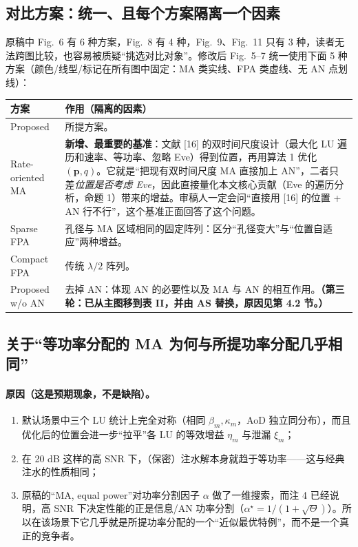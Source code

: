 \documentclass[11pt,a4paper]{ctexart}
\begin{document}
\subsection{对比方案：统一、且每个方案隔离一个因素}
原稿中 Fig.~6 有 6 种方案，Fig.~8 有 4 种，Fig.~9、Fig.~11 只有 3 种，读者无法跨图比较，也容易被质疑“挑选对比对象”。修改后 Fig.~5--7 统一使用下面 5 种方案（颜色/线型/标记在所有图中固定：MA 类实线、FPA 类虚线、无 AN 点划线）：
\begin{longtable}{p{3.2cm}p{12.5cm}}
\toprule
方案 & 作用（隔离的因素）\\ \midrule
Proposed & 所提方案。\\
Rate-oriented MA & \textbf{新增、最重要的基准}：文献 [16] 的双时间尺度设计（最大化 LU 遍历和速率、等功率、忽略 Eve）得到位置，再用算法 1 优化 $(\mathbf p,q)$。它就是“把现有双时间尺度 MA 直接加上 AN”，二者只差\emph{位置是否考虑 Eve}，因此直接量化本文核心贡献（Eve 的遍历分析，命题 1）带来的增益。审稿人一定会问“直接用 [16] 的位置 + AN 行不行”，这个基准正面回答了这个问题。\\
Sparse FPA & 孔径与 MA 区域相同的固定阵列：区分“孔径变大”与“位置自适应”两种增益。\\
Compact FPA & 传统 $\lambda/2$ 阵列。\\
Proposed w/o AN & 去掉 AN：体现 AN 的必要性以及 MA 与 AN 的相互作用。\textbf{（第三轮：已从主图移到表 II，并由 AS 替换，原因见第 4.2 节。）}\\
\bottomrule
\end{longtable}

\subsection{关于“等功率分配的 MA 为何与所提功率分配几乎相同”}
\paragraph{原因（这是预期现象，不是缺陷）。}
\begin{enumerate}
\item 默认场景中三个 LU 统计上完全对称（相同 $\beta_m,\kappa_m$，AoD 独立同分布），而且优化后的位置会进一步“拉平”各 LU 的等效增益 $\eta_m$ 与泄漏 $\xi_m$；
\item 在 20 dB 这样的高 SNR 下，（保密）注水解本身就趋于等功率——这与经典注水的性质相同；
\item 原稿的“MA, equal power”对功率分割因子 $\alpha$ 做了一维搜索，而注 4 已经说明，高 SNR 下决定性能的正是信息/AN 功率分割（$\alpha^\star=1/(1+\sqrt\Theta)$）。所以在该场景下它几乎就是所提功率分配的一个“近似最优特例”，而不是一个真正的竞争者。
\end{enumerate}
\end{document}
